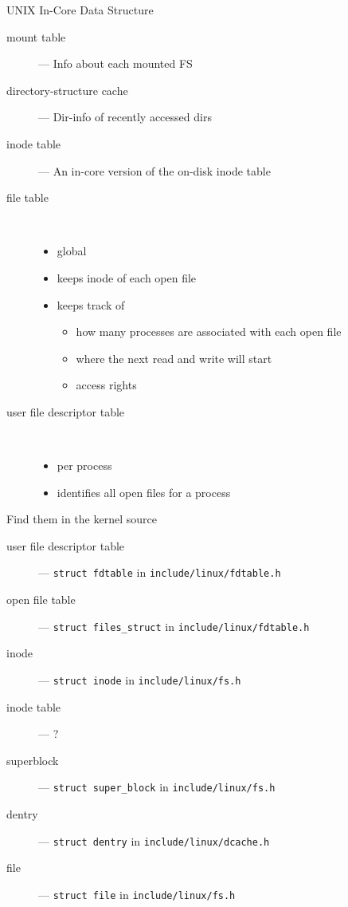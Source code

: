 \begin{frame}{UNIX In-Core Data Structure}
  \begin{description}
  \item[mount table] --- Info about each mounted FS
  \item[directory-structure cache] --- Dir-info of recently
      accessed dirs
  \item[inode table] --- An in-core version of the on-disk inode table
  \item[file table]\ 
    \begin{itemize}
    \item global
    \item keeps inode of each open file
    \item keeps track of
      \begin{itemize}
      \item how many processes are associated with each open file
      \item where the next read and write will start
      \item access rights
      \end{itemize}
    \end{itemize}
  \item[user file descriptor table]\ 
    \begin{itemize}
    \item per process
    \item identifies all open files for a process
    \end{itemize}
  \end{description}
\end{frame}

Find them in the kernel source
  \begin{description}
  \item[user file descriptor table] --- \texttt{struct fdtable} in
    \texttt{include/linux/fdtable.h}
  \item[open file table] --- \texttt{struct files\_struct} in
    \texttt{include/linux/fdtable.h}
  \item[inode] --- \texttt{struct inode} in \texttt{include/linux/fs.h}
  \item[inode table] --- ?
  \item[superblock] --- \texttt{struct super\_block} in \texttt{include/linux/fs.h}
  \item[dentry] --- \texttt{struct dentry} in \texttt{include/linux/dcache.h}
  \item[file] --- \texttt{struct file} in \texttt{include/linux/fs.h}
  \end{description}

